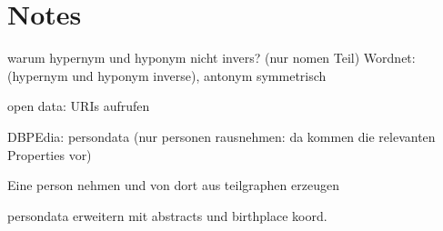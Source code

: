 \documentclass[a4paper]{scrartcl}
\begin{document}
\section{Notes}

warum hypernym und hyponym nicht invers? (nur nomen Teil)
Wordnet: (hypernym und hyponym inverse), antonym symmetrisch

open data: URIs aufrufen



DBPEdia: persondata (nur personen rausnehmen: da kommen die relevanten Properties vor)

Eine person nehmen und von dort aus teilgraphen erzeugen

persondata erweitern mit abstracts und birthplace koord.
\end{document}
